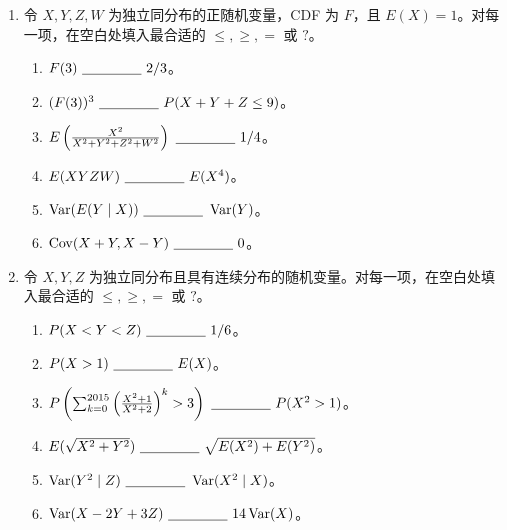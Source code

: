 \documentclass[UTF8, 12pt, fontset=fandol, oneside]{ctexart}
\begin{document}
\begin{enumerate}
  \item 令 $X,Y,Z,W$ 为独立同分布的正随机变量，CDF 为 $F$，且 $E(X)=1$。对每一项，在空白处填入最合适的 $\le,\ge,=$ 或 $?$。
  \begin{enumerate}
    \item $F(3)\ \underline{\hspace{1.5cm}}\ 2/3$。
    \item $(F(3))^3\ \underline{\hspace{1.5cm}}\ P(X+Y+Z\le 9)$。
    \item $E\left(\frac{X^2}{X^2+Y^2+Z^2+W^2}\right)\ \underline{\hspace{1.5cm}}\ 1/4$。
    \item $E(XYZW)\ \underline{\hspace{1.5cm}}\ E(X^4)$。
    \item $\operatorname{Var}(E(Y\mid X))\ \underline{\hspace{1.5cm}}\ \operatorname{Var}(Y)$。
    \item $\operatorname{Cov}(X+Y,X-Y)\ \underline{\hspace{1.5cm}}\ 0$。
  \end{enumerate}

  \item 令 $X,Y,Z$ 为独立同分布且具有连续分布的随机变量。对每一项，在空白处填入最合适的 $\le,\ge,=$ 或 $?$。
  \begin{enumerate}
    \item $P(X<Y<Z)\ \underline{\hspace{1.5cm}}\ 1/6$。
    \item $P(X>1)\ \underline{\hspace{1.5cm}}\ E(X)$。
    \item $P\left(\sum_{k=0}^{2015}\left(\frac{X^2+1}{X^2+2}\right)^k>3\right)\ \underline{\hspace{1.5cm}}\ P(X^2>1)$。
    \item $E(\sqrt{X^2+Y^2})\ \underline{\hspace{1.5cm}}\ \sqrt{E(X^2)+E(Y^2)}$。
    \item $\operatorname{Var}(Y^2\mid Z)\ \underline{\hspace{1.5cm}}\ \operatorname{Var}(X^2\mid X)$。
    \item $\operatorname{Var}(X-2Y+3Z)\ \underline{\hspace{1.5cm}}\ 14\operatorname{Var}(X)$。
  \end{enumerate}


\end{enumerate}
\end{document}
